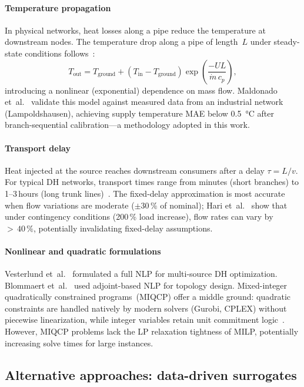 \documentclass[review,3p]{elsarticle}
\begin{document}
\paragraph{Temperature propagation}
In physical networks, heat losses along a pipe reduce the temperature
at downstream nodes. The temperature drop along a pipe of length~$L$
under steady-state conditions follows~\cite{vanderHeijde2017}:
%
\begin{equation*}
  T_{\mathrm{out}} = T_{\mathrm{ground}}
    + (T_{\mathrm{in}} - T_{\mathrm{ground}})
      \exp\!\left(\frac{-UL}{\dot{m}\,c_p}\right),
\end{equation*}
%
introducing a nonlinear (exponential) dependence on mass flow.
Maldonado et~al.~\cite{Maldonado2024} validate this model against
measured data from an industrial network (Lampoldshausen), achieving
supply temperature MAE below \SI{0.5}{\celsius} after
branch-sequential calibration---a methodology adopted in this work.

\paragraph{Transport delay}
Heat injected at the source reaches downstream consumers after a
delay $\tau = L/v$. For typical DH networks, transport times range
from minutes (short branches) to 1--3\,hours (long trunk
lines)~\cite{vanderHeijde2017,Giraud2015}. The fixed-delay
approximation is most accurate when flow variations are moderate
($\pm 30\,\%$ of nominal); Hari et~al.~\cite{Hari2024} show that
under contingency conditions (200\,\% load increase), flow rates can
vary by ${>}\,40\,\%$, potentially invalidating fixed-delay
assumptions.

\paragraph{Nonlinear and quadratic formulations}
Vesterlund et~al.~\cite{Vesterlund2017} formulated a full NLP for
multi-source DH optimization. Blommaert et~al.~\cite{Blommaert2020}
used adjoint-based NLP for topology design. Mixed-integer
quadratically constrained programs~(MIQCP) offer a middle ground:
quadratic constraints are handled natively by modern solvers (Gurobi,
CPLEX) without piecewise linearization, while integer variables retain
unit commitment logic~\cite{Ommen2016}. However, MIQCP problems lack
the LP relaxation tightness of MILP, potentially increasing solve
times for large instances.

\subsection{Alternative approaches: data-driven surrogates}
\label{sec:rw_surrogates}
\end{document}
